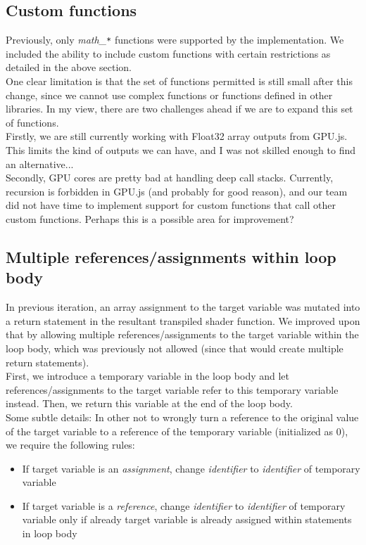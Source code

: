 \subsection*{Custom functions}

Previously, only \textit{math\_\texttt{*}} functions were supported by the implementation. We included the ability to include custom functions with certain restrictions as detailed in the above section.\\

One clear limitation is that the set of functions permitted is still small after this change, since we cannot use complex functions or functions defined in other libraries. In my view, there are two challenges ahead if we are to expand this set of functions. \\

Firstly, we are still currently working with Float32 array outputs from GPU.js. This limits the kind of outputs we can have, and I was not skilled enough to find an alternative...\\

Secondly, GPU cores are pretty bad at handling deep call stacks. Currently, recursion is forbidden in GPU.js (and probably for good reason), and our team did not have time to implement support for custom functions that call other custom functions. Perhaps this is a possible area for improvement?


\subsection*{Multiple references/assignments within loop body}

In previous iteration, an array assignment to the target variable was mutated into a return statement in the resultant transpiled shader function. We improved upon that by allowing multiple references/assignments to the target variable within the loop body, which was previously not allowed (since that would create multiple return statements).\\

First, we introduce a temporary variable in the loop body and let references/assignments to the target variable refer to this temporary variable instead. Then, we return this variable at the end of the loop body.\\

Some subtle details: In other not to wrongly turn a reference to the original value of the target variable to a reference of the temporary variable (initialized as 0), we require the following rules:
\begin{itemize}
    \item{If target variable is an \textit{assignment}, change \textit{identifier} to \textit{identifier} of temporary variable}
    \item{If target variable is a \textit{reference}, change \textit{identifier} to \textit{identifier} of temporary variable only if already target variable is already assigned within statements in loop body}
\end{itemize}



